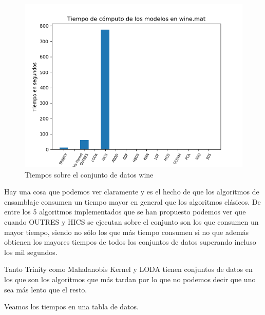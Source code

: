 \begin{figure}[H]
	\centering
	\label{wine_times}
	\includegraphics[scale=0.7]{imagenes/imgs-exp1/times/wine}
	\caption{Tiempos sobre el conjunto de datos wine}
\end{figure}

Hay una cosa que podemos ver claramente y es el hecho de que los algoritmos de ensamblaje consumen un tiempo mayor en general que los algoritmos clásicos. De entre los 5 algoritmos implementados que se han propuesto podemos ver que cuando OUTRES y HICS se ejecutan sobre el conjunto son los que consumen un mayor tiempo, siendo no sólo los que más tiempo consumen si no que además obtienen los mayores tiempos de todos los conjuntos de datos superando incluso los mil segundos.

Tanto Trinity como Mahalanobis Kernel y LODA tienen conjuntos de datos en los que son los algoritmos que más tardan por lo que no podemos decir que uno sea más lento que el resto. 

Veamos los tiempos en una tabla de datos.

